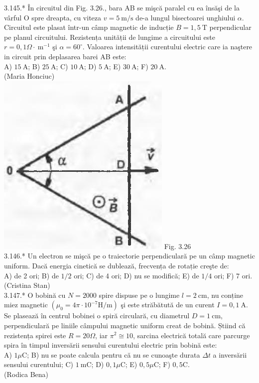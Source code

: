 3.145.* În circuitul din Fig. 3.26., bara AB se mişcă paralel cu ea însăşi de la vârful O spre dreapta, cu viteza $v=5 \mathrm{~m} / \mathrm{s}$ de-a lungul bisectoarei unghiului $\alpha$. Circuitul este plasat într-un câmp magnetic de inducție $B=1,5 \mathrm{~T}$ perpendicular pe planul circuitului. Rezistența unității de lungime a circuitului este $r=0,1 \Omega \cdot \mathrm{~m}^{-1}$ şi $\alpha=60^{\circ}$. Valoarea intensității curentului electric care ia naştere in circuit prin deplasarea barei AB este:\\ A) $15 \mathrm{~A}$; B) $25 \mathrm{~A}$; C) $10 \mathrm{~A}$; D) $5 \mathrm{~A}$; E) $30 \mathrm{~A}$; F) $20 \mathrm{~A}$.\\ (Maria Honciuc)\\ \includegraphics[width=0.4\linewidth]{images/2025_07_01_5b3ff9fa0d508c8e9f17g-175} Fig. 3.26\\

3.146.* Un electron se mişcă pe o traiectorie perpendiculară pe un câmp magnetic uniform. Dacă energia cinetică se dublează, frecvența de rotație creşte de:\\ A) de 2 ori; B) de $1 / 2$ ori; C) de 4 ori; D) nu se modifică; E) de $1 / 4$ ori; F) 7 ori.\\ (Cristina Stan)\\

3.147.* O bobină cu $N=2000$ spire dispuse pe o lungime $l=2 \mathrm{~cm}$, nu conține miez magnetic $\left(\mu_{0}=4 \pi \cdot 10^{-7} \mathrm{H} / \mathrm{m}\right)$ şi este străbătută de un curent $I=0,1 \mathrm{~A}$. Se plasează în centrul bobinei o spiră circulară, cu diametrul $D=1 \mathrm{~cm}$, perpendiculară pe liniile câmpului magnetic uniform creat de bobină. Știind că rezistența spirei este $R=20 \Omega$, iar $\pi^{2} \cong 10$, sarcina electrică totală care parcurge spira în timpul inversării sensului curentului electric prin bobină este:\\ A) $1 \mu \mathrm{C}$; B) nu se poate calcula pentru că nu se cunoaşte durata $\Delta t$ a inversării sensului curentului; C) $1 \mathrm{~mC}$; D) $0,1 \mu \mathrm{C}$; E) $0,5 \mu \mathrm{C}$; F) $0,5 \mathrm{C}$.\\ (Rodica Bena)\\

